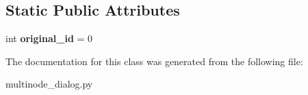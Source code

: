 \subsection*{Static Public Attributes}
\begin{DoxyCompactItemize}
\item 
\hypertarget{class_sim_g_d_c_1_1multinode__dialog_1_1_multi_node_dialog_afb77dcb09741ec2ecac5a9bd863a6742}{}int {\bfseries original\+\_\+id} = 0\label{class_sim_g_d_c_1_1multinode__dialog_1_1_multi_node_dialog_afb77dcb09741ec2ecac5a9bd863a6742}

\end{DoxyCompactItemize}


The documentation for this class was generated from the following file\+:\begin{DoxyCompactItemize}
\item 
multinode\+\_\+dialog.\+py\end{DoxyCompactItemize}
